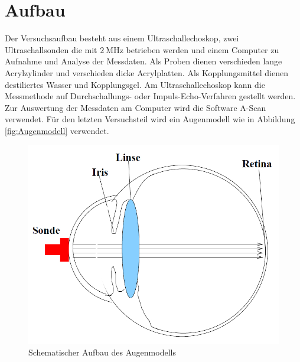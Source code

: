 \section{Aufbau}
\label{sec:Aufbau}

Der Versuchsaufbau besteht aus einem Ultraschallechoskop, zwei Ultraschallsonden die mit $\SI{2}{\mega\hertz}$ betrieben werden und einem Computer zu Aufnahme und Analyse der Messdaten. Als Proben dienen verschieden lange Acrylzylinder und verschieden dicke Acrylplatten. Als Kopplungsmittel dienen destiliertes Wasser und Kopplungsgel. Am Ultraschallechoskop kann die Messmethode auf Durchschallungs- oder Impuls-Echo-Verfahren gestellt werden. Zur Auswertung der Messdaten am Computer wird die Software A-Scan verwendet. Für den letzten Versuchsteil wird ein Augenmodell wie in Abbildung \ref{fig:Augenmodell} verwendet. 
\begin{figure}
\centering
\includegraphics[scale=0.3]{content/images/Augenmodell.jpg}
\caption{Schematischer Aufbau des Augenmodells \cite{US1}}
\label{fig:Aufbau}
\end{figure}